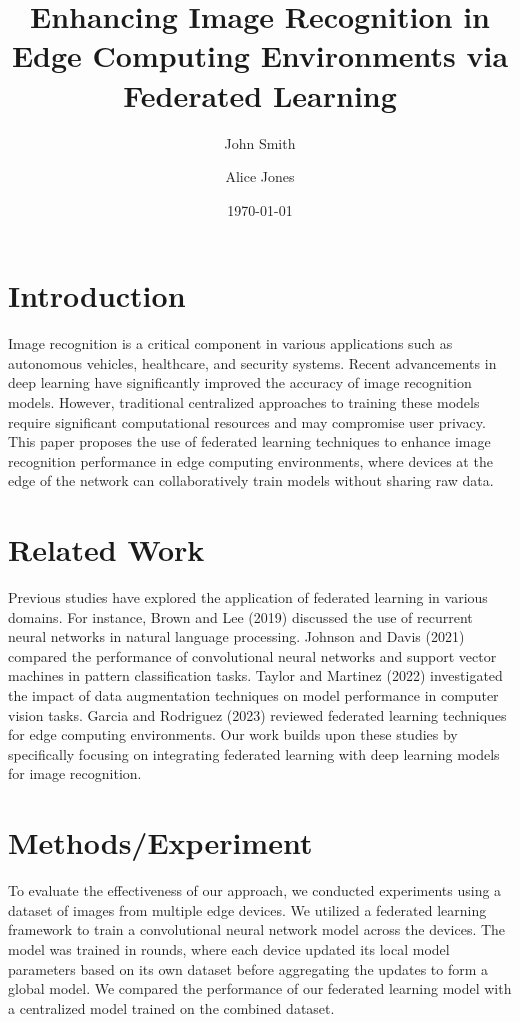 \documentclass{article}
\title{Enhancing Image Recognition in Edge Computing Environments via Federated Learning}
\author{John Smith \and Alice Jones}
\date{\today}
\begin{document}
\maketitle

\section{Introduction}
Image recognition is a critical component in various applications such as autonomous vehicles, healthcare, and security systems. Recent advancements in deep learning have significantly improved the accuracy of image recognition models. However, traditional centralized approaches to training these models require significant computational resources and may compromise user privacy. This paper proposes the use of federated learning techniques to enhance image recognition performance in edge computing environments, where devices at the edge of the network can collaboratively train models without sharing raw data.

\section{Related Work}
Previous studies have explored the application of federated learning in various domains. For instance, Brown and Lee (2019) discussed the use of recurrent neural networks in natural language processing. Johnson and Davis (2021) compared the performance of convolutional neural networks and support vector machines in pattern classification tasks. Taylor and Martinez (2022) investigated the impact of data augmentation techniques on model performance in computer vision tasks. Garcia and Rodriguez (2023) reviewed federated learning techniques for edge computing environments. Our work builds upon these studies by specifically focusing on integrating federated learning with deep learning models for image recognition.

\section{Methods/Experiment}
To evaluate the effectiveness of our approach, we conducted experiments using a dataset of images from multiple edge devices. We utilized a federated learning framework to train a convolutional neural network model across the devices. The model was trained in rounds, where each device updated its local model parameters based on its own dataset before aggregating the updates to form a global model. We compared the performance of our federated learning model with a centralized model trained on the combined dataset.
\end{document}
